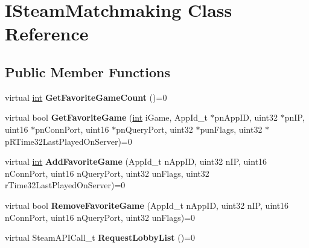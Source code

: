 \hypertarget{classISteamMatchmaking}{}\section{I\+Steam\+Matchmaking Class Reference}
\label{classISteamMatchmaking}
\subsection*{Public Member Functions}
\begin{DoxyCompactItemize}
\item 
\hypertarget{classISteamMatchmaking_a6be9442319d642a4d73270b81db845f8}{}virtual \hyperlink{SDL__thread_8h_a6a64f9be4433e4de6e2f2f548cf3c08e}{int} {\bfseries Get\+Favorite\+Game\+Count} ()=0\label{classISteamMatchmaking_a6be9442319d642a4d73270b81db845f8}

\item 
\hypertarget{classISteamMatchmaking_a81aa9e83108de1baa3944f24a470e96e}{}virtual bool {\bfseries Get\+Favorite\+Game} (\hyperlink{SDL__thread_8h_a6a64f9be4433e4de6e2f2f548cf3c08e}{int} i\+Game, App\+Id\+\_\+t $\ast$pn\+App\+I\+D, uint32 $\ast$pn\+I\+P, uint16 $\ast$pn\+Conn\+Port, uint16 $\ast$pn\+Query\+Port, uint32 $\ast$pun\+Flags, uint32 $\ast$p\+R\+Time32\+Last\+Played\+On\+Server)=0\label{classISteamMatchmaking_a81aa9e83108de1baa3944f24a470e96e}

\item 
\hypertarget{classISteamMatchmaking_aedae56e457b44270b6bc3a1e8558fee7}{}virtual \hyperlink{SDL__thread_8h_a6a64f9be4433e4de6e2f2f548cf3c08e}{int} {\bfseries Add\+Favorite\+Game} (App\+Id\+\_\+t n\+App\+I\+D, uint32 n\+I\+P, uint16 n\+Conn\+Port, uint16 n\+Query\+Port, uint32 un\+Flags, uint32 r\+Time32\+Last\+Played\+On\+Server)=0\label{classISteamMatchmaking_aedae56e457b44270b6bc3a1e8558fee7}

\item 
\hypertarget{classISteamMatchmaking_a598b028a11268947068416171fec6181}{}virtual bool {\bfseries Remove\+Favorite\+Game} (App\+Id\+\_\+t n\+App\+I\+D, uint32 n\+I\+P, uint16 n\+Conn\+Port, uint16 n\+Query\+Port, uint32 un\+Flags)=0\label{classISteamMatchmaking_a598b028a11268947068416171fec6181}

\item 
\hypertarget{classISteamMatchmaking_ab11d5a805d6b00605fa60f28d1a6de4b}{}virtual Steam\+A\+P\+I\+Call\+\_\+t {\bfseries Request\+Lobby\+List} ()=0\label{classISteamMatchmaking_ab11d5a805d6b00605fa60f28d1a6de4b}


\end{DoxyCompactItemize}
